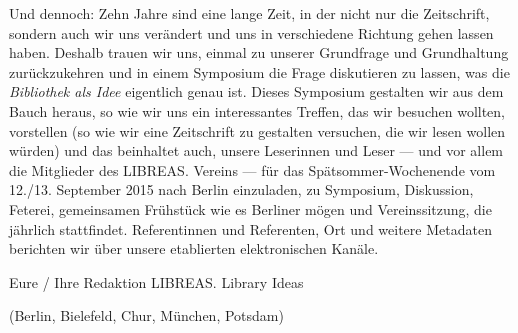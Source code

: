 \documentclass[a4paper,
fontsize=11pt,
oneside,
numbers=noperiodatend,
parskip=half-,
bibliography=totoc,
final
]{scrartcl}
\begin{document}
Und dennoch: Zehn Jahre sind eine lange Zeit, in der nicht nur die
Zeitschrift, sondern auch wir uns verändert und uns in verschiedene
Richtung gehen lassen haben. Deshalb trauen wir uns, einmal zu unserer
Grundfrage und Grundhaltung zurückzukehren und in einem Symposium die
Frage diskutieren zu lassen, was die \emph{Bibliothek als Idee}
eigentlich genau ist. Dieses Symposium gestalten wir aus dem Bauch
heraus, so wie wir uns ein interessantes Treffen, das wir besuchen
wollten, vorstellen (so wie wir eine Zeitschrift zu gestalten versuchen,
die wir lesen wollen würden) und das beinhaltet auch, unsere Leserinnen
und Leser --- und vor allem die Mitglieder des LIBREAS. Vereins --- für
das Spätsommer-Wochenende vom 12./13. September 2015 nach Berlin
einzuladen, zu Symposium, Diskussion, Feterei, gemeinsamen Frühstück wie
es Berliner mögen und Vereinssitzung, die jährlich stattfindet.
Referentinnen und Referenten, Ort und weitere Metadaten berichten wir
über unsere etablierten elektronischen Kanäle.

Eure / Ihre Redaktion LIBREAS. Library Ideas

(Berlin, Bielefeld, Chur, München, Potsdam)

\end{document}
